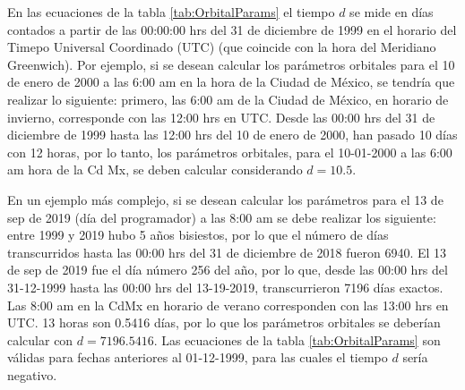 \documentclass[a4paper,10pt]{article}
\begin{document}
En las ecuaciones de la tabla \ref{tab:OrbitalParams} el tiempo $d$ se mide en días contados a partir de las 00:00:00 hrs del 31 de diciembre de 1999 en el horario del Timepo Universal Coordinado (UTC) (que coincide con la hora del Meridiano Greenwich). Por ejemplo, si se desean calcular los parámetros orbitales para el 10 de enero de 2000 a las 6:00 am en la hora de la Ciudad de México, se tendría que realizar lo siguiente: primero, las 6:00 am de la Ciudad de México, en horario de invierno, corresponde con las 12:00 hrs en UTC. Desde las 00:00 hrs del 31 de diciembre de 1999 hasta las 12:00 hrs del 10 de enero de 2000, han pasado 10 días con 12 horas, por lo tanto, los parámetros orbitales, para el 10-01-2000 a las 6:00 am hora de la Cd Mx, se deben calcular considerando $d=10.5$.

En un ejemplo más complejo, si se desean calcular los parámetros para el 13 de sep de 2019 (día del programador) a las 8:00 am se debe realizar los siguiente: entre 1999 y 2019 hubo 5 años bisiestos, por lo que el número de días transcurridos hasta las 00:00 hrs del 31 de diciembre de 2018 fueron 6940. El 13 de sep de 2019 fue el día número 256 del año, por lo que, desde las 00:00 hrs del 31-12-1999 hasta las 00:00 hrs del 13-19-2019, transcurrieron 7196 días exactos. Las 8:00 am en la CdMx en horario de verano corresponden con las 13:00 hrs  en UTC. 13 horas son 0.5416 días, por lo que los parámetros orbitales se deberían calcular con $d=7196.5416$. Las ecuaciones de la tabla \ref{tab:OrbitalParams} son válidas para fechas anteriores al 01-12-1999, para las cuales el tiempo $d$ sería negativo. 
\end{document}
